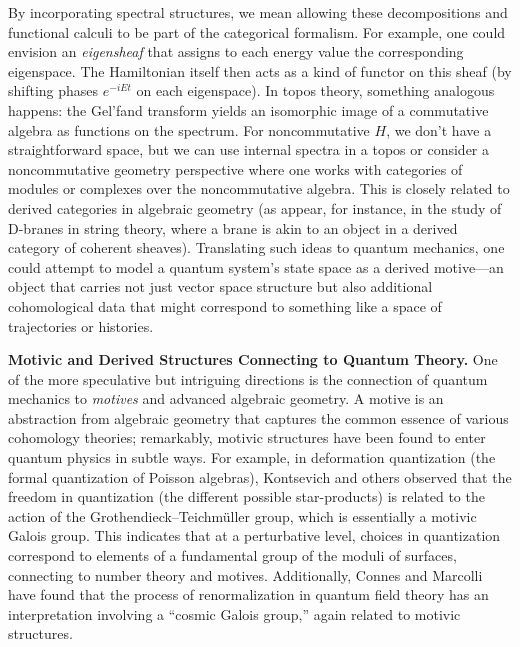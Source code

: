 \documentclass[12pt]{article}
\begin{document}
By incorporating spectral structures, we mean allowing these decompositions and functional calculi to be part of the categorical formalism. For example, one could envision an \emph{eigensheaf} that assigns to each energy value the corresponding eigenspace. The Hamiltonian itself then acts as a kind of functor on this sheaf (by shifting phases $e^{-iEt}$ on each eigenspace). In topos theory, something analogous happens: the Gel’fand transform yields an isomorphic image of a commutative algebra as functions on the spectrum. For noncommutative $H$, we don’t have a straightforward space, but we can use internal spectra in a topos or consider a noncommutative geometry perspective where one works with categories of modules or complexes over the noncommutative algebra. This is closely related to derived categories in algebraic geometry (as appear, for instance, in the study of D-branes in string theory, where a brane is akin to an object in a derived category of coherent sheaves). Translating such ideas to quantum mechanics, one could attempt to model a quantum system’s state space as a derived motive---an object that carries not just vector space structure but also additional cohomological data that might correspond to something like a space of trajectories or histories.

\medskip
\textbf{Motivic and Derived Structures Connecting to Quantum Theory.} One of the more speculative but intriguing directions is the connection of quantum mechanics to \emph{motives} and advanced algebraic geometry. A motive is an abstraction from algebraic geometry that captures the common essence of various cohomology theories; remarkably, motivic structures have been found to enter quantum physics in subtle ways. For example, in deformation quantization (the formal quantization of Poisson algebras), Kontsevich and others observed that the freedom in quantization (the different possible star-products) is related to the action of the Grothendieck--Teichmüller group, which is essentially a motivic Galois group. This indicates that at a perturbative level, choices in quantization correspond to elements of a fundamental group of the moduli of surfaces, connecting to number theory and motives. Additionally, Connes and Marcolli have found that the process of renormalization in quantum field theory has an interpretation involving a ``cosmic Galois group,'' again related to motivic structures.
\end{document}
